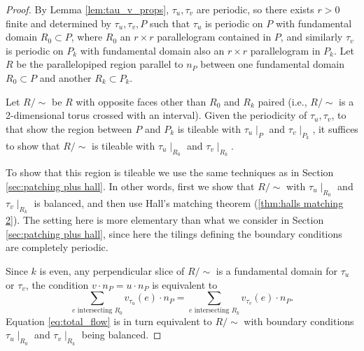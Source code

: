\documentclass[11pt]{article}
\theoremstyle{remark}
\theoremstyle{definition}
\begin{document}
\begin{proof}
    By Lemma \ref{lem:tau_v_props}, $\tau_u,\tau_v$ are periodic, so there exists $r>0$ finite and determined by $\tau_u,\tau_v,P$ such that $\tau_u$ is periodic on $P$ with fundamental domain $R_0\subset P$, where $R_0$ an $r\times r$ parallelogram contained in $P$, and similarly $\tau_v$ is periodic on $P_k$ with fundamental domain also an $r\times r$ parallelogram in $P_k$. Let $R$ be the parallelopiped region parallel to $n_P$ between one fundamental domain $R_0\subset P$ and another $R_k\subset P_k$.

    Let $R/\sim$ be $R$ with opposite faces other than $R_0$ and $R_k$ paired (i.e., $R/\sim$ is a 2-dimensional torus crossed with an interval). Given the periodicity of $\tau_u,\tau_v$, to that show the region between $P$ and $P_k$ is tileable with $\tau_u\mid_{P}$ and $\tau_v\mid_{P_k}$, it suffices to show that $R/\sim$ is tileable with $\tau_u\mid_{R_0}$ and $\tau_{v}\mid_{R_k}$. 

    To show that this region is tileable we use the same techniques as in Section \ref{sec:patching plus hall}. In other words, first we show that $R/\sim$ with $\tau_u\mid_{R_0}$ and $\tau_{v}\mid_{R_k}$ is balanced, and then use Hall's matching theorem (\ref{thm:halls matching 2}). The setting here is more elementary than what we consider in Section \ref{sec:patching plus hall}, since here the tilings defining the boundary conditions are completely periodic. 

    Since $k$ is even, any perpendicular slice of $R/\sim$ is a fundamental domain for $\tau_u$ or $\tau_v$, the condition $v\cdot n_P = u\cdot n_P$ is equivalent to
    \begin{equation}\label{eq:total_flow}
    \sum_{e \text{ intersecting }R_0} v_{\tau_u}(e) \cdot n_P = \sum_{e \text{ intersecting }R_k} v_{\tau_v}(e) \cdot n_P.
\end{equation}
    Equation \eqref{eq:total_flow} is in turn equivalent to $R/\sim$ with boundary conditions $\tau_u\mid_{R_0}$ and $\tau_{v}\mid_{R_k}$ being balanced. 


\end{proof}
\end{document}
